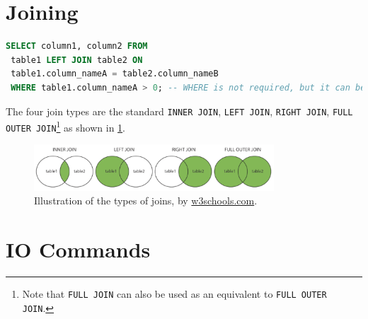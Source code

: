 \section{Joining}
\label{sql:join}

\begin{lstlisting}[language=SQL]
SELECT column1, column2 FROM
 table1 LEFT JOIN table2 ON
 table1.column_nameA = table2.column_nameB
 WHERE table1.column_nameA > 0; -- WHERE is not required, but it can be included here
\end{lstlisting}

The four join types are the standard
\texttt{INNER JOIN}, \texttt{LEFT JOIN}, \texttt{RIGHT JOIN},
\texttt{FULL OUTER JOIN}\footnote{Note that \texttt{FULL JOIN} can also be used as an equivalent to \texttt{FULL OUTER JOIN}.} as
shown in \cref{fig:sql:joins}.

\begin{figure}[H]
\centering
\includegraphics[width=0.8\textwidth]{figures/sql/joins.png}
\caption{
Illustration of the types of joins, by \href{https://www.w3schools.com/sql/sql_join.asp}{w3schools.com}.
}
\label{fig:sql:joins}
\end{figure}

\section{IO Commands}
\label{sql:io}

